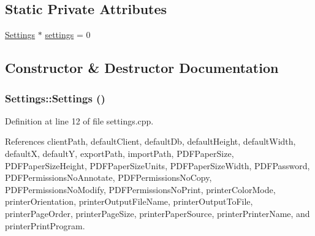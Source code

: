 \subsection*{Static Private Attributes}
\begin{CompactItemize}
\item 
\hyperlink{classSettings}{Settings} $\ast$ \hyperlink{classSettings_v0}{settings} = 0
\end{CompactItemize}


\subsection{Constructor \& Destructor Documentation}
\hypertarget{classSettings_d0}{
\subsubsection[Settings]{\setlength{\rightskip}{0pt plus 5cm}Settings::Settings ()}}
\label{classSettings_d0}


Definition at line 12 of file settings.cpp.

References client\-Path, default\-Client, default\-Db, default\-Height, default\-Width, default\-X, default\-Y, export\-Path, import\-Path, PDFPaper\-Size, PDFPaper\-Size\-Height, PDFPaper\-Size\-Units, PDFPaper\-Size\-Width, PDFPassword, PDFPermissions\-No\-Annotate, PDFPermissions\-No\-Copy, PDFPermissions\-No\-Modify, PDFPermissions\-No\-Print, printer\-Color\-Mode, printer\-Orientation, printer\-Output\-File\-Name, printer\-Output\-To\-File, printer\-Page\-Order, printer\-Page\-Size, printer\-Paper\-Source, printer\-Printer\-Name, and printer\-Print\-Program.

